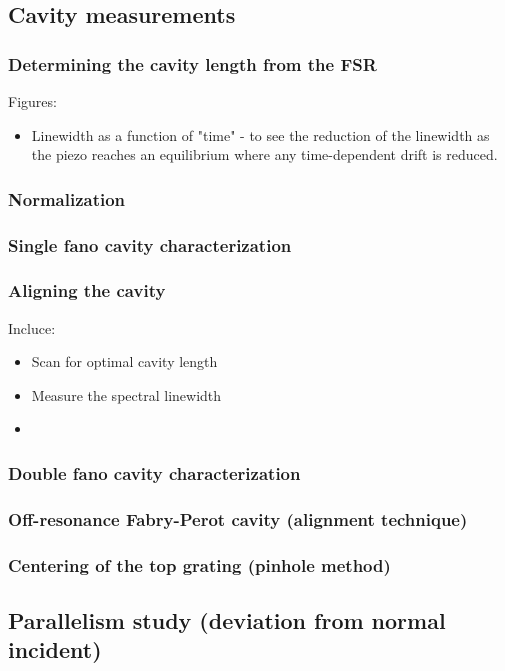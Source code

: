 \subsection{Cavity measurements}

\subsubsection{Determining the cavity length from the FSR}

Figures: 
\begin{itemize}
    \item Linewidth as a function of "time" - to see the reduction of the linewidth as the piezo reaches an equilibrium where any time-dependent drift is reduced. 
\end{itemize}

\subsubsection{Normalization}

\subsubsection{Single fano cavity characterization} 

\subsubsection{Aligning the cavity}

Incluce: 
\begin{itemize}
    \item Scan for optimal cavity length
    \item Measure the spectral linewidth
    \item 
\end{itemize}

\subsubsection{Double fano cavity characterization}

\subsubsection{Off-resonance Fabry-Perot cavity (alignment technique)}

\subsubsection{Centering of the top grating (pinhole method)}

\subsection{Parallelism study (deviation from normal incident)}